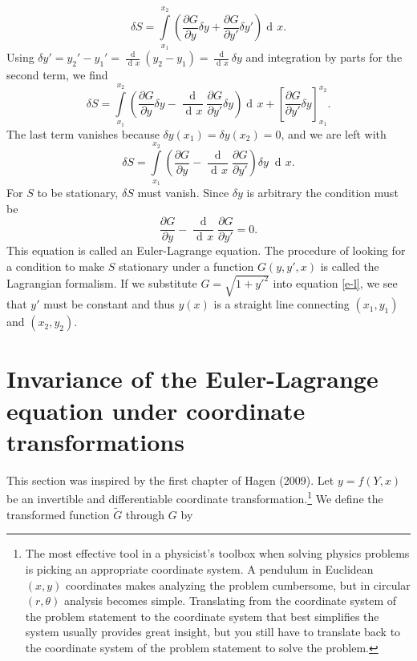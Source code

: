 \documentclass[prb,preprint]{revtex4-1}
\DeclareMathOperator{\dd}{d\!}
\DeclareMathOperator{\ddd}{\mathrm{d}}
\begin{document}
\begin{equation}
\delta S = \int\limits_{x_1}^{x_2} \left(\frac{\partial G}{\partial y} \delta y
+ \frac{\partial G}{\partial y'} \delta y' \right) \dd x.
\end{equation}
Using $\delta y' = y_2' - y_1' = \frac{\ddd }{\dd x}(y_2 - y_1) = \frac{\ddd}{\dd x} \delta y$ and integration by parts for the second term, we find
\begin{equation}
\delta S = \int\limits_{x_1}^{x_2} \left( \frac{\partial G}{\partial y} \delta y
- \frac{\ddd}{\dd x}\frac{\partial G}{\partial y'} \delta y \right) \dd x
+ \left[\frac{\partial G}{\partial y'} \delta y \right]_{x_1}^{x_2}.
\end{equation}
The last term vanishes because $\delta y(x_1) = \delta y(x_2) = 0$, and we are left with
\begin{equation}
\delta S = \int\limits_{x_1}^{x_2} \left( \frac{\partial G}{\partial y}
- \frac{\ddd}{\dd x}\frac{\partial G}{\partial y'} \right) \delta y \; \dd x.
\end{equation}
For $S$ to be stationary, $\delta S$ must vanish. Since $\delta y$ is arbitrary the condition must be
\begin{equation}\label{e-l}
\frac{\partial G}{\partial y} - \frac{\ddd}{\dd x}\frac{\partial G}{\partial y'} = 0.
\end{equation}
This equation is called an Euler-Lagrange equation. The procedure of looking for a condition to make $S$ stationary under a function $G(y,y',x)$ is called the Lagrangian formalism. If we substitute $G = \sqrt{1+y'^2}$ into equation \eqref{e-l}, we see that $y'$ must be constant and thus $y(x)$ is a straight line connecting $(x_1,y_1)$ and $(x_2,y_2)$.

\section{Invariance of the Euler-Lagrange equation under coordinate transformations} \label{invariance}

This section was inspired by the first chapter of Hagen (2009)\cite{hagen2009path}. Let $y=f(Y,x)$ be an invertible and differentiable coordinate transformation.\footnote{The most effective tool in a physicist's toolbox when solving physics problems is picking an appropriate coordinate system. A pendulum in Euclidean $(x,y)$ coordinates makes analyzing the problem cumbersome, but in circular $(r,\theta)$ analysis becomes simple. Translating from the coordinate system of the problem statement to the coordinate system that best simplifies the system usually provides great insight, but you still have to translate back to the coordinate system of the problem statement to solve the problem.} We define the transformed function $\widetilde{G}$ through $G$ by
\end{document}

